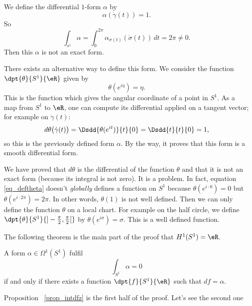 	We define the differential $1$-form $\alpha$ by
	\[
		\alpha(\dot\gamma(t))=1.
	\]
	So
	\[
		\int_{s^1}\alpha=\int_0^{2\pi}\alpha_{\sigma(t)}(\dot \sigma(t))\,dt=2\pi\neq0.
	\]
	Then this $\alpha$ is not an exact form.

	There exists an alternative way to define this form. We consider the function $\dpt{ \theta }{ S^1 }{ \eR }$ given by
	\begin{equation} \label{eq_deftheta}
		\theta(e^{i\eta})=\eta.
	\end{equation}
	This is the function which gives the angular coordinate of a point in $S^1$. As a map from $S^1$ to $\eR$, one can compute its differential applied on a tangent vector; for example on $\dot\gamma(t)$:
	\[
		d\theta\big( \dot\gamma(t) \big)=\Dsdd{ \theta(e^{it}) }{t}{0}=\Dsdd{ t }{t}{0}=1,
	\]
	so this is the previously defined form $\alpha$. By the way, it proves that this form is a smooth differential form.

	We have proved that $d\theta$ is the differential of the function $\theta$ and that it is not an exact form (because its integral is not zero). It is a problem. In fact, equation \eqref{eq_deftheta} doesn't \emph{globally} defines a function on $S^1$ because $\theta(e^{i\cdot 0})=0$ but $\theta(e^{i\cdot 2\pi})=2\pi$. In other words, $\theta(1)$ is not well defined. Then we can only define the function $\theta$ on a local chart. For example on the half circle, we define $\dpt{ \theta }{ S^1 }{ ]-\frac{ \pi }{ 2 },\frac{ \pi }{2}[ }$ by $\theta(e^{i\sigma})=\sigma$. This is a well defined function.

	The following theorem is the main part of the proof that $H^1(S^1)=\eR$.

	\begin{theorem}
		A form $\alpha\in\Omega^1(S^1)$ fulfil
		\[
			\int_{S^1}\alpha=0
		\]
		if and only if there exists a function $\dpt{ f }{ S^1 }{ \eR }$ such that $df=\alpha$.
	\end{theorem}
	Proposition ~\ref{prop_intdfz} is the first half of the proof. Let's see the second one

